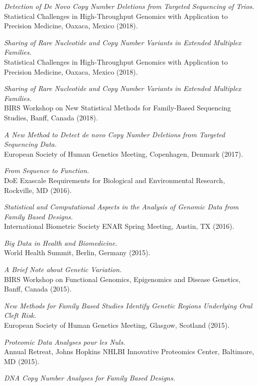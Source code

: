 \documentclass[10pt]{article}
\newcommand{\dn}[1]{{\color{black} {#1}}}
\begin{document}
\item
{\it Detection of De Novo Copy Number Deletions from Targeted Sequencing of Trios.}\\
Statistical Challenges in High-Throughput Genomics with Application to Precision Medicine,
\dn{Oaxaca, Mexico}
(2018).
\item
{\it Sharing of Rare Nucleotide and Copy Number Variants in Extended Multiplex Families.}\\
Statistical Challenges in High-Throughput Genomics with Application to Precision Medicine,
\dn{Oaxaca, Mexico}
(2018).
\item
{\it Sharing of Rare Nucleotide and Copy Number Variants in Extended Multiplex Families.}\\
BIRS Workshop on New Statistical Methods for Family-Based Sequencing Studies, 
\dn{Banff, Canada}
(2018).
\item
{\it A New Method to Detect de novo Copy Number Deletions from Targeted Sequencing Data.}\\
European Society of Human Genetics Meeting, \dn{Copenhagen, Denmark}
(2017).
\item
{\it From Sequence to Function.}\\
DoE Exascale Requirements for Biological and Environmental Research, \dn{Rockville, MD}
(2016).
\item
{\it Statistical and Computational Aspects in the Analysis of Genomic Data from Family Based Designs.}\\
International Biometric Society ENAR Spring Meeting, \dn{Austin, TX}
(2016).
\item
{\it Big Data in Health and Biomedicine.}\\ 
World Health Summit, \dn{Berlin, Germany}
(2015).
\item
{\it A Brief Note about Genetic Variation.}\\
BIRS Workshop on Functional Genomics, Epigenomics and Disease Genetics, \dn{Banff, Canada}
(2015).
\item
{\it New Methods for Family Based Studies Identify Genetic Regions Underlying Oral Cleft Risk.}\\
European Society of Human Genetics Meeting, \dn{Glasgow, Scotland}
(2015).
\item
{\it Proteomic Data Analyses pour les Nuls.}\\
Annual Retreat, Johns Hopkins NHLBI Innovative Proteomics Center, \dn{Baltimore, MD}
(2015).
\item
{\it DNA Copy Number Analyses for Family Based Designs.}\\
\end{document}
